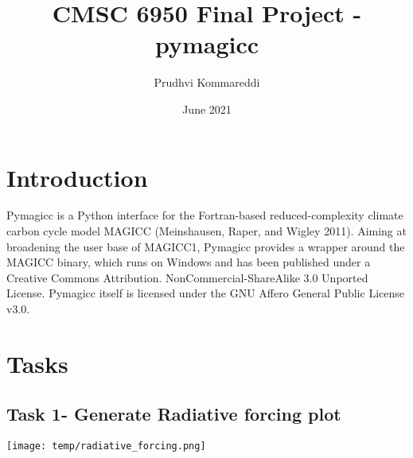 \documentclass{article}
\title{CMSC 6950 Final Project - pymagicc}
\author{Prudhvi Kommareddi}
\date{June 2021}
\begin{document}
\maketitle

\section{Introduction}
Pymagicc is a Python interface for the Fortran-based reduced-complexity climate carbon cycle model MAGICC (Meinshausen, Raper, and Wigley 2011). Aiming at broadening the user base of MAGICC1, Pymagicc provides a wrapper around the MAGICC binary, which runs on Windows and has been published under a Creative Commons Attribution. NonCommercial-ShareAlike 3.0 Unported License. Pymagicc itself is licensed under the GNU Affero General Public License v3.0.

\section{Tasks}

\subsection{Task 1- Generate Radiative forcing plot}

\texttt{[image: temp/radiative\_forcing.png]}
\end{document}
